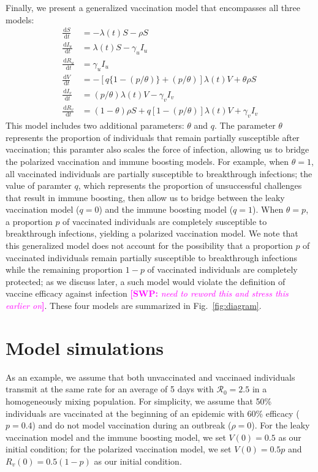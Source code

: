 \documentclass[12pt]{article}
\newcommand{\comment}{\showcomment}
\newcommand{\showcomment}[3]{\textcolor{#1}{\textbf{[#2: }\textsl{#3}\textbf{]}}}
\newcommand{\swp}[1]{\comment{magenta}{SWP}{#1}}
\newcommand{\fref}[1]{Fig.~\ref{fig:#1}}
\newcommand{\dd}[1]{\ensuremath{\, \mathrm{d}#1}}
\begin{document}
Finally, we present a generalized vaccination model that encompasses all three models:
\begin{align}
\frac{\dd S}{\dd t} &= - \lambda(t) S - \rho S \\
\frac{\dd I_u}{\dd t} &= \lambda(t) S - \gamma_u I_u \\
\frac{\dd R_u}{\dd t} &= \gamma_u I_u \\
\frac{\dd V}{\dd t} &= - [q \{1-(p/\theta)\} + (p/\theta)] \lambda(t) V + \theta \rho S \\
\frac{\dd I_v}{\dd t} &= (p/\theta) \lambda(t) V - \gamma_v I_v \\
\frac{\dd R_v}{\dd t} &= (1 - \theta) \rho S + q [1-(p/\theta)] \lambda(t) V + \gamma_v I_v
\end{align}
This model includes two additional parameters: $\theta$ and $q$.
The parameter $\theta$ represents the proportion of individuals that remain partially susceptible after vaccination;
this paramter also scales the force of infection, allowing us to bridge the polarized vaccination and immune boosting models.
For example, when $\theta = 1$, all vaccinated individuals are partially susceptible to breakthrough infections;
the value of paramter $q$, which represents the proportion of unsuccessful challenges that result in immune boosting, then allow us to bridge between the leaky vaccination model ($q=0$) and the immune boosting model ($q = 1$).
When $\theta = p$, a proportion $p$ of vaccinated individuals are completely susceptible to breakthrough infections, yielding a polarized vaccination model.
We note that this generalized model does not account for the possibility that a proportion $p$ of vaccinated individuals remain partially susceptible to breakthrough infections while the remaining proportion $1-p$ of vaccinated individuals are completely protected; 
as we discuss later, a such model would violate the definition of vaccine efficacy against infection \swp{need to reword this and stress this earlier on}.
These four models are summarized in \fref{diagram}.

\section{Model simulations}


As an example, we assume that both unvaccinated and vaccinaed individuals transmit at the same rate for an average of 5 days with $\mathcal R_0 = 2.5$ in a homogeneously mixing population.
For simplicity, we assume that 50\% individuals are vaccinated at the beginning of an epidemic with 60\% efficacy ($p=0.4$) and do not model vaccination during an outbreak ($\rho = 0$).
For the leaky vaccination model and the immune boosting model, we set $V(0) = 0.5$ as our initial condition;
for the polarized vaccination model, we set $V(0) = 0.5 p$ and $R_v(0) = 0.5 (1-p)$ as our initial condition.
\end{document}
